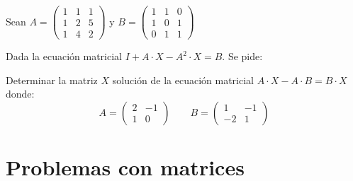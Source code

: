 \begin{ejer}
 Sean 
$A=\begin{pmatrix}
 1 & 1 & 1 \\
 1 & 2 & 5 \\
 1 & 4 & 2
\end{pmatrix} $ y 
$B=\begin{pmatrix}
 1 & 1 & 0 \\
 1 & 0 & 1 \\
 0 & 1 & 1 
\end{pmatrix} $
\bex
{}
\eex 
\begin{solu}
\end{solu}
\end{ejer}

\begin{ejer}
 Dada la ecuación matricial $I+A \cdot X-A^2\cdot X=B$. Se pide:
\bex
{}
\eex
\end{ejer}


\begin{ejer}
Determinar la matriz $X$ solución de la ecuación matricial $A\cdot X -A \cdot B= B \cdot X$ donde:
\[ A=\begin{pmatrix}
 2 & -1 \\
 1 & 0 
\end{pmatrix}
\qquad
B=\begin{pmatrix}
 1 & -1 \\
 -2 & 1 
\end{pmatrix} \]
\begin{solu}
\end{solu}
\end{ejer}


\newpage

\section{Problemas con matrices}

